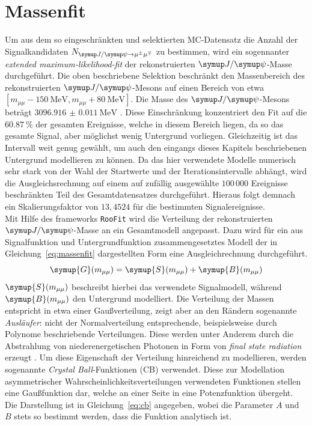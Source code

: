 \section{Massenfit}
\label{sec:massenfit}
Um aus dem so eingeschränkten und selektierten MC-Datensatz die Anzahl der Signalkandidaten $N_{\kontroll}$ zu bestimmen, wird ein sogennanter \textit{extended maximum-likelihood-fit} \cite{extended} der rekonstruierten $\jpsi$-Masse durchgeführt. Die oben
beschriebene Selektion beschränkt den Massenbereich des rekonstruierten $\jpsi$-Mesons auf einen Bereich von etwa
$[m_{\mu\mu}-\SI{150}{\mega\electronvolt}, m_{\mu\mu}+\SI{80}{\mega\electronvolt}]$. Die Masse des $\jpsi$-Mesons beträgt $\SI{3096.916(11)}{\mega\electronvolt}$ \cite{pdg}. Diese Einschränkung konzentriert den Fit auf die $\SI{60.87}{\percent}$ der gesamten Ereignisse, welche in diesem Bereich liegen, da so das gesamte Signal, aber möglichst wenig Untergrund vorliegen. Gleichzeitig ist das Intervall weit genug gewählt, um auch den eingangs dieses Kapitels beschriebenen Untergrund modellieren zu können. Da das hier verwendete Modelle numerisch sehr stark von der Wahl der Startwerte und der Iterationsintervalle abhängt, wird die Ausgleichsrechnung auf einem auf zufällig ausgewählte $100\,000$ Ereignisse beschränkten Teil des Gesamtdatensatzes durchgeführt. Hieraus folgt demnach ein Skalierungsfaktor von $13,4524$ für die bestimmten Signalereignisse. \\
%
Mit Hilfe des frameworks \texttt{RooFit} \cite{roofit} wird die Verteilung der rekonstruierten $\jpsi$-Masse an ein Gesamtmodell angepasst. Dazu wird für ein aus Signalfunktion und Untergrundfunktion zusammengesetztes Modell der in Gleichung~\ref{eq:massenfit} dargestellten Form eine Ausgleichrechnung durchgeführt.
%
\begin{equation}
  \symup{G}(m_{\mu\mu})= \symup{S}(m_{\mu\mu}) + \symup{B}(m_{\mu\mu})
  \label{eq:massenfit}
\end{equation}
%
$\symup{S}(m_{\mu\mu})$ beschreibt hierbei das verwendete Signalmodell, während $\symup{B}(m_{\mu\mu})$ den Untergrund modelliert. Die Verteilung der Massen entspricht in etwa einer Gaußverteilung, zeigt aber an den Rändern sogenannte \textit{Ausläufer}: nicht der Normalverteilung entsprechende, beispielsweise durch Polynome beschriebende Verteilungen. Diese werden unter Anderem durch die Abstrahlung von niederenergetischen Photonen in Form von \textit{final state radiation} erzeugt \cite{cb}. Um diese Eigenschaft der Verteilung hinreichend zu modellieren, werden sogenannte \textit{Crystal Ball}-Funktionen (CB) verwendet. Diese zur Modellation asymmetrischer Wahrscheinlichkeitsverteilungen verwendeten Funktionen stellen eine Gaußfunktion dar, welche an einer Seite in eine Potenzfunktion übergeht. Die Darstellung ist in Gleichung~\ref{eq:cb} \cite{cb} angegeben, wobei die Parameter $A$ und $B$ stets so bestimmt werden, dass die Funktion analytisch ist.
